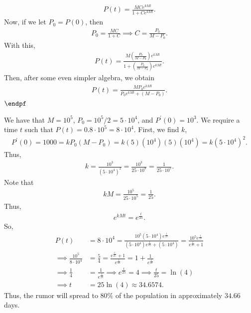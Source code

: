 \documentclass{report}
\begin{document}
\begin{remark}
            \begin{align*}
                P(t) = \frac{MCe^{kMt}}{1+Ce^{kMt}}
            .\end{align*}
            Now, if we let $P_{0} = P(0)$, then 
            \begin{align*}
                P_{0} = \frac{MC}{1+C} \implies C = \frac{P_{0}}{M-P_{0}}
            .\end{align*}
            With this, 
            \begin{align*}
                P(t) = \frac{M\left(\frac{P_{0}}{M-P_{0}}\right)e^{kMt}}{1+\left(\frac{P_{0}}{M-P_{0}}\right)e^{kMt}}
            .\end{align*}
            Then, after some even simpler algebra, we obtain 
            \begin{align*}
                P(t) = \frac{MP_{0}e^{kMt}}{P_{0}e^{kMt} + (M-P_{0})} 
            .\end{align*}
            $\endpf $
    \end{remark}
    \bigbreak \noindent 
    We have that $M=10^{5}$, $P_{0} = 10^{5}/2 = 5 \cdot 10^{4} $, and $P^{\prime}(0) = 10^{3}$. We require a time $t$ such that $P(t) = 0.8 \cdot 10^{5} = 8 \cdot 10^{4} $. First, we find $k$,
    \begin{align*}
        P^{\prime}(0) = 1000 = kP_{0}(M-P_{0}) = k(5)(10^{4})(5)(10^{4}) = k(5\cdot 10^{4})^{2}
    .\end{align*}
    Thus,  
    \begin{align*}
        k = \frac{10^{3}}{(5\cdot 10^{4})^{2}} = \frac{10^{3}}{25 \cdot 10^{8}} = \frac{1}{25 \cdot 10^{5}}
    .\end{align*}
    Note that 
    \begin{align*}
        kM = \frac{10^{5}}{25 \cdot 10^{5}} = \frac{1}{25}
    .\end{align*}
    Thus, 
    \begin{align*}
        e^{kMt} = e^{\frac{t}{25}}
    .\end{align*}
    So,
    \begin{align*}
        P(t) &= 8 \cdot 10^{4} = \frac{10^{5}(5\cdot 10^{4})e^{\frac{t}{25}}}{(5\cdot 10^{4})e^{\frac{t}{25}} + (5\cdot 10^{4})} = \frac{10^{5}e^{\frac{t}{25}}}{e^{\frac{t}{25}} +1} \\
        \implies \frac{10^{5}}{8\cdot 10^{4}} &= \frac{5}{4} = \frac{e^{\frac{t}{25}} + 1}{e^{\frac{t}{25}}} = 1 + \frac{1}{e^{\frac{t}{25}}} \\
        \implies \frac{1}{4} &= \frac{1}{e^{\frac{t}{25}}} \implies e^{\frac{t}{25}} = 4 \implies \frac{t}{25} = \ln{\left(4\right)} \\
        \implies t &= 25\ln{\left(4\right)} \approx 34.6574
    .\end{align*}
    Thus, the rumor will spread to $80\%$ of the population in approximately $34.66$ days.
    
\end{document}
